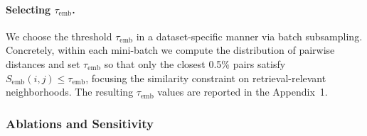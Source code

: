 \documentclass[sigconf, nonacm]{acmart}
\begin{document}
\paragraph{Selecting $\tau_{\text{emb}}$.}
We choose the threshold $\tau_{\text{emb}}$ in a dataset-specific manner via batch subsampling. Concretely, within each mini-batch we compute the distribution of pairwise distances and set $\tau_{\text{emb}}$ so that only the closest 0.5\% pairs satisfy $S_{\text{emb}}(i,j)\le \tau_{\text{emb}}$, focusing the similarity constraint on retrieval-relevant neighborhoods. The resulting $\tau_{\text{emb}}$ values are reported in the Appendix~1.

\begin{table}[t]
\caption{NeuRoute build-time breakdown (seconds). Add/Build $=$ Index build $+$ CSR build $+$ Clustering $+$ Other/I/O, and Total $=$ Train $+$ Add/Build. Index build performs full-base encoding. CSR build constructs CSR files. Clustering is bucket-local clustering. Other/I/O is residual overhead.}
\label{tab:NeuRoute_time_breakdown}
\centering
\scriptsize
\setlength{\tabcolsep}{3pt}
\renewcommand{\arraystretch}{1.05}
\end{table}


\subsubsection{Ablations and Sensitivity}
\label{sec:ablation_sensitivity}
\end{document}
